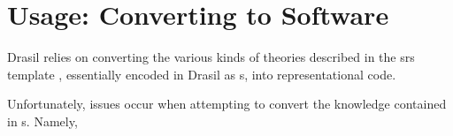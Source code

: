 \section{Usage: Converting to Software}

Drasil relies on converting the various kinds of theories described in the
\acs{srs} template \cite{SmithAndLai2005}, essentially encoded in Drasil as
\RelationConcept{}s, into representational code.


Unfortunately, issues occur when attempting to convert the knowledge contained
in \RelationConcept{}s. Namely,


